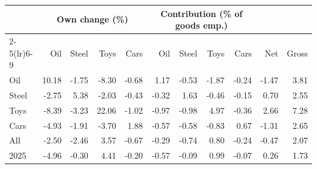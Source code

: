 \begin{tabular}{lrrrrrrrrrr}
\toprule
 & \multicolumn{4}{c}{Own change (\%)} & \multicolumn{4}{c}{Contribution (\% of goods emp.)} & & \\
\cmidrule(lr){2-5}\cmidrule(lr){6-9}
 & Oil & Steel & Toys & Cars & Oil & Steel & Toys & Cars & Net & Gross \\
\midrule
Oil & 10.18 & -1.75 & -8.30 & -0.68 & 1.17 & -0.53 & -1.87 & -0.24 & -1.47 & 3.81 \\
Steel & -2.75 & 5.38 & -2.03 & -0.43 & -0.32 & 1.63 & -0.46 & -0.15 & 0.70 & 2.55 \\
Toys & -8.39 & -3.23 & 22.06 & -1.02 & -0.97 & -0.98 & 4.97 & -0.36 & 2.66 & 7.28 \\
Cars & -4.93 & -1.91 & -3.70 & 1.88 & -0.57 & -0.58 & -0.83 & 0.67 & -1.31 & 2.65 \\
All & -2.50 & -2.46 & 3.57 & -0.67 & -0.29 & -0.74 & 0.80 & -0.24 & -0.47 & 2.07 \\
2025 & -4.96 & -0.30 & 4.41 & -0.20 & -0.57 & -0.09 & 0.99 & -0.07 & 0.26 & 1.73 \\
\bottomrule
\end{tabular}
